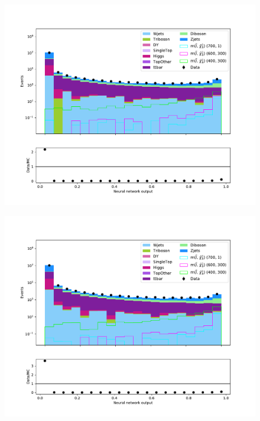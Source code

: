 \begin{figure}[H]
    \centering
        \includegraphics[width = \textwidth]{Figures/Stacked/stackedplot_NN_All_level_slepslep.pdf}
        \caption{}
        \label{fig:traintestscaled}
\end{figure}

\begin{figure}[H]
    \centering
        \includegraphics[width = \textwidth]{Figures/Stacked/stackedplot_NN_Low_level_slepslep.pdf}
        \caption{}
        \label{fig:traintestscaled}
\end{figure}

